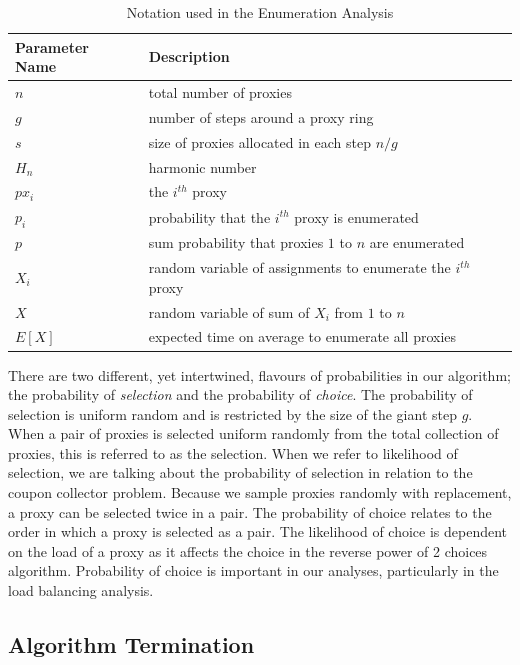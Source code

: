 \begin{table}[h]
  \centering
	\begin{tabular}{ll}
	\hline
	\cline{1-2}
	Parameter Name    & Description  \\
	\hline
    $n$     & total number of proxies \\
	$g$     & number of steps around a proxy ring  \\
	$s$     & size of proxies allocated in each step $n/g$ \\
    $H_n$   & harmonic number \\
    $px_i$  & the $i^{th}$ proxy \\
    $p_i$   & probability that the $i^{th}$ proxy is enumerated \\
    $p$     & sum probability that proxies $1$ to $n$ are enumerated \\
    $X_i$   & random variable of assignments to enumerate the $i^{th}$ proxy \\
    $X$     & random variable of sum of $X_i$ from $1$ to $n$ \\
    $E[X]$  & expected time on average to enumerate all proxies \\
	\hline
	\end{tabular}
  \caption{Notation used in the Enumeration Analysis}
  \label{tab:vars}
\end{table}

There are two different, yet intertwined, flavours of probabilities in our algorithm; the probability of \textit{selection} and the probability of \textit{choice}. The probability of selection is uniform random and is restricted by the size of the giant step $g$. When a pair of proxies is selected uniform randomly from the total collection of proxies, this is referred to as the selection. When we refer to likelihood of selection, we are talking about the probability of selection in relation to the coupon collector problem. Because we sample proxies randomly with replacement, a proxy can be selected twice in a pair. The probability of choice relates to the order in which a proxy is selected as a pair. The likelihood of choice is dependent on the load of a proxy as it affects the choice in the reverse power of 2 choices algorithm. Probability of choice is important in our analyses, particularly in the load balancing analysis.

\subsection{Algorithm Termination}

